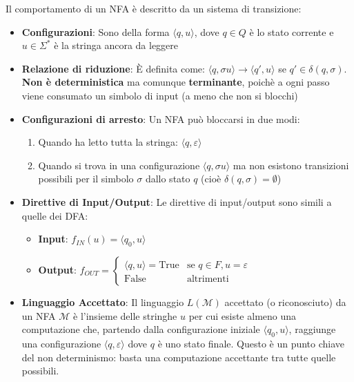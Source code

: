 \documentclass[12pt, a4paper]{report}
\begin{document}
                Il comportamento di un NFA è descritto da un sistema di transizione:
                \begin{itemize}
                    \item \textbf{Configurazioni}: Sono della forma $\langle q, u \rangle$, dove $q \in Q$ è lo stato corrente e $u \in \Sigma^*$ è la stringa ancora da leggere
                    \item \textbf{Relazione di riduzione}: È definita come: $\langle q, \sigma u \rangle \to \langle q', u \rangle$ se $q' \in \delta(q, \sigma)$. \textbf{Non è deterministica} ma comunque \textbf{terminante}, poichè a ogni passo viene consumato un simbolo di input (a meno che non si blocchi)
                    \item \textbf{Configurazioni di arresto}: Un NFA può bloccarsi in due modi: \begin{enumerate}
                        \item Quando ha letto tutta la stringa: $\langle q, \varepsilon \rangle$
                        \item Quando si trova in una configurazione $\langle q, \sigma u \rangle$ ma non esistono transizioni possibili per il simbolo $\sigma$ dallo stato $q$ (cioè $\delta(q, \sigma) = \emptyset$)
                    \end{enumerate}
                    \item \textbf{Direttive di Input/Output}: Le direttive di input/output sono simili a quelle dei DFA: \begin{itemize}
                        \item \textbf{Input}: $f_{IN}(u) = \langle q_0, u \rangle$
                        \item \textbf{Output}: $f_{OUT}=\begin{cases}
                            \langle q, u \rangle = \text{True} & \text{se }q \in F, u = \varepsilon\\
                            \text{False} & \text{altrimenti}
                        \end{cases}$
                    \end{itemize}
                    \item \textbf{Linguaggio Accettato}: Il linguaggio $L(\mathcal{M})$ accettato (o riconosciuto) da un NFA $\mathcal{M}$ è l'insieme delle stringhe $u$ per cui esiste almeno una computazione che, partendo dalla configurazione iniziale $\langle q_0, u \rangle$, raggiunge una configurazione $\langle q, \varepsilon \rangle$ dove $q$ è uno stato finale. Questo è un punto chiave del non determinismo: basta una computazione accettante tra tutte quelle possibili.\\

\end{itemize}
\end{document}
